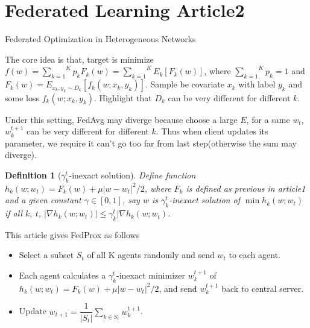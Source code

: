 \documentclass[12pt, a4paper, oneside]{article}
\newtheorem{definition}[theorem]{Definition}
\begin{document}
\section{Federated Learning Article2}
    Federated Optimization in Heterogeneous Networks\cite{li2020federated}


    The core idea is that, target is minimize $f(w)=\overset{K}{\underset{k=1}\sum}p_kF_k(w)=\overset{K}{\underset{k=1}\sum}E_k\left[ F_k(w) \right]$, where $\overset{K}{\underset{k=1}\sum}p_k=1$ and $F_k(w)=E_{x_k,y_k\sim D_k}\left[ f_k(w;x_k,y_k) \right]$. Sample be covariate $x_k$ with label $y_k$ and some loss $f_k(w;x_k,y_k)$. Highlight that $D_k$ can be very different for different $k$.


    Under this setting, FedAvg may diverge because choose a large $E$, for a same $w_t$, $w_k^{t+1}$ can be very different for different $k$. Thus when client updates its parameter, we require it can't go too far from last step(otherwise the sum may diverge).


    \begin{definition}[$\gamma_k^t$-inexact solution]
        Define function $h_k(w;w_t)=F_k(w)+\mu|w-w_t|^2/2$, where $F_k$ is defined as previous in article1 and a given constant $\gamma\in[0,1]$, say $w$ is $\gamma_k^t$-inexact solution of $\min h_k(w;w_t)$ if all $k,\ t$, $|\nabla h_k(w;w_t)|\leq\gamma_k^t|\nabla h_k(w;w_t)$.
    \end{definition}


    This article gives FedProx as follows
    \begin{itemize}
        \item Select a subset $S_t$ of all K agents randomly and send $w_t$ to each agent.
        \item Each agent calculates a $\gamma_k^t$-inexact minimizer $w_k^{t+1}$ of $h_k(w;w_t)=F_k(w)+\mu|w-w_t|^2/2$, and send $w_k^{t+1}$ back to central server.
        \item Update $w_{t+1}=\dfrac{1}{|S_t|}\overset{}{\underset{k\in S_t}\sum}w_k^{t+1}$.
    \end{itemize}
    
\newpage


\end{document}
